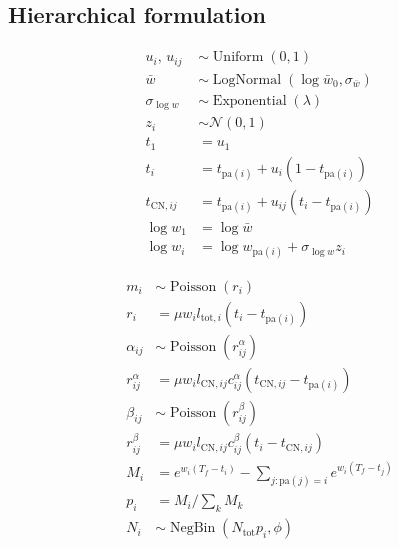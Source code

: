 \subsection{Hierarchical formulation}

{\small
\setlength{\abovedisplayskip}{2pt}
\setlength{\belowdisplayskip}{2pt}
\setlength{\jot}{2pt}

\noindent
\begin{minipage}[t]{0.49\linewidth}
\[
\begin{aligned}
u_i,\,u_{ij} &\sim \operatorname{Uniform}(0,1)\\
\bar w &\sim \operatorname{LogNormal}(\log\bar w_0,\sigma_{\bar w})\\
\sigma_{\log w} &\sim \operatorname{Exponential}(\lambda)\\
z_i &\sim \mathcal{N}(0,1)\\
t_1 &= u_1\\
t_i &= t_{\mathrm{pa}(i)}+u_i(1-t_{\mathrm{pa}(i)})\\
t_{\mathrm{CN},ij} &= t_{\mathrm{pa}(i)}+u_{ij}(t_i-t_{\mathrm{pa}(i)})\\
\log w_1 &= \log\bar w\\
\log w_i &= \log w_{\mathrm{pa}(i)}+\sigma_{\log w}z_i
\end{aligned}
\]
\end{minipage}\hfill
\begin{minipage}[t]{0.49\linewidth}
\[
\begin{aligned}
m_i &\sim \operatorname{Poisson}(r_i)\\
r_i &= \mu w_i l_{\mathrm{tot},i}(t_i-t_{\mathrm{pa}(i)})\\
\alpha_{ij} &\sim \operatorname{Poisson}(r^\alpha_{ij})\\
r^\alpha_{ij} &= \mu w_i l_{\mathrm{CN},ij} c^\alpha_{ij}(t_{\mathrm{CN},ij}-t_{\mathrm{pa}(i)})\\
\beta_{ij} &\sim \operatorname{Poisson}(r^\beta_{ij})\\
r^\beta_{ij} &= \mu w_i l_{\mathrm{CN},ij} c^\beta_{ij}(t_i-t_{\mathrm{CN},ij})\\
M_i &= e^{w_i(T_f-t_i)}-\!\!\sum_{j:\mathrm{pa}(j)=i}\!\! e^{w_i(T_f-t_j)}\\
p_i &= M_i\big/\textstyle\sum_k M_k\\
N_i &\sim \operatorname{NegBin}(N_{\mathrm{tot}}p_i,\phi)
\end{aligned}
\]
\end{minipage}
}